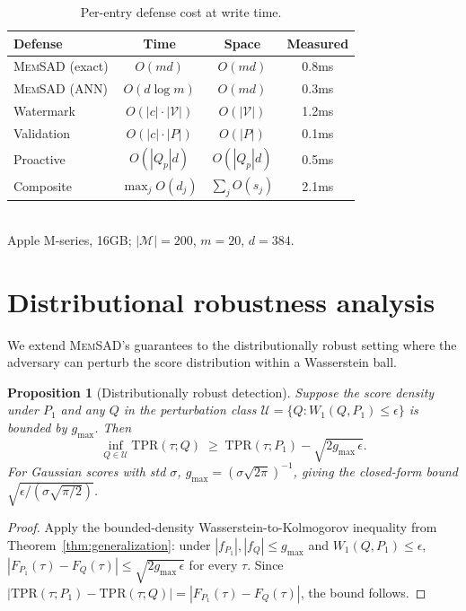 \documentclass{article}
\newtheorem{proposition}[theorem]{Proposition}
\theoremstyle{definition}
\newcommand{\tpr}{\text{TPR}}
\newcommand{\cM}{\mathcal{M}}
\newcommand{\cV}{\mathcal{V}}
\newcommand{\cU}{\mathcal{U}}
\newcommand{\memsad}{\textnormal{\textsc{MemSAD}}}
\begin{document}
\begin{table}[ht]
  \centering
  \small
  \caption{Per-entry defense cost at write time.}
  \label{tab:complexity}
  \vspace{2pt}
  \begin{tabular}{lccc}
    \toprule
    Defense & Time & Space & Measured \\
    \midrule
    \memsad{} (exact) & $O(md)$ & $O(md)$ & 0.8ms \\
    \memsad{} (ANN) & $O(d \log m)$ & $O(md)$ & 0.3ms \\
    Watermark & $O(|c| \cdot |\cV|)$ & $O(|\cV|)$ & 1.2ms \\
    Validation & $O(|c| \cdot |P|)$ & $O(|P|)$ & 0.1ms \\
    Proactive & $O(|Q_p| d)$ & $O(|Q_p| d)$ & 0.5ms \\
    Composite & $\max_j O(d_j)$ & $\sum_j O(s_j)$ & 2.1ms \\
    \bottomrule
  \end{tabular}
  \\[2pt]
  {\footnotesize Apple M-series, 16GB; $|\cM|=200$, $m=20$, $d=384$.}
\end{table}

\section{Distributional robustness analysis}
\label{app:dro}

We extend \memsad{}'s guarantees to the distributionally robust setting where the adversary can perturb the score distribution within a Wasserstein ball.

\begin{proposition}[Distributionally robust detection]
\label{prop:dro}
Suppose the score density under $P_1$ and any $Q$ in the perturbation class $\cU = \{Q : W_1(Q, P_1) \leq \epsilon\}$ is bounded by $g_{\max}$. Then
\begin{equation}
  \inf_{Q \in \cU} \tpr(\tau; Q) \;\geq\; \tpr(\tau; P_1) - \sqrt{2 g_{\max}\,\epsilon}.
\end{equation}
For Gaussian scores with std $\sigma$, $g_{\max} = (\sigma\sqrt{2\pi})^{-1}$, giving the closed-form bound $\sqrt{\epsilon / (\sigma\sqrt{\pi/2})}$.
\end{proposition}

\begin{proof}
Apply the bounded-density Wasserstein-to-Kolmogorov inequality from Theorem~\ref{thm:generalization}: under $|f_{P_1}|, |f_Q| \leq g_{\max}$ and $W_1(Q,P_1) \leq \epsilon$, $|F_{P_1}(\tau) - F_Q(\tau)| \leq \sqrt{2 g_{\max}\,\epsilon}$ for every $\tau$. Since $|\tpr(\tau;P_1) - \tpr(\tau;Q)| = |F_{P_1}(\tau) - F_Q(\tau)|$, the bound follows.
\end{proof}
\end{document}
